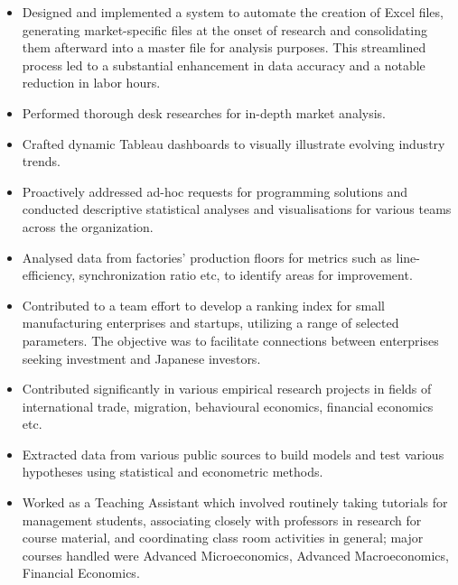 \documentclass[9pt,a4paper]{altacv}
\begin{document}
\begin{itemize}
    \item Designed and implemented a system to automate the creation of Excel files, generating market-specific files at the onset of research and consolidating them afterward into a master file for analysis purposes. This streamlined process led to a substantial enhancement in data accuracy and a notable reduction in labor hours.
    \item Performed thorough desk researches for in-depth market analysis.
    \item Crafted dynamic Tableau dashboards to visually illustrate evolving industry trends.
    \item Proactively addressed ad-hoc requests for programming solutions and conducted descriptive statistical analyses and visualisations for various teams across the organization.
\end{itemize}
\divider
{}
\begin{itemize}
    \item Analysed data from factories’ production floors for metrics such as line-efficiency, synchronization ratio etc, to identify areas for improvement.
    \item Contributed to a team effort to develop a ranking index for small manufacturing enterprises and startups, utilizing a range of selected parameters. The objective was to facilitate connections between enterprises seeking investment and Japanese investors.
\end{itemize}
\divider
{}
\begin{itemize}
    \item Contributed significantly in various empirical research projects in fields of international trade, migration, behavioural economics, financial economics etc.
    \item Extracted data from various public sources to build models and test various hypotheses using statistical and econometric methods.
    \item Worked as a Teaching Assistant which involved routinely taking tutorials for management students, associating closely with professors in research for course material, and coordinating class room activities in general; major courses handled were Advanced Microeconomics, Advanced Macroeconomics, Financial Economics.
\end{itemize}
\end{document}

